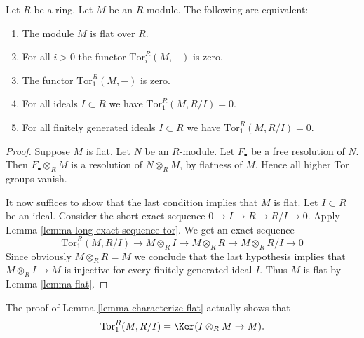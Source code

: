 \begin{lemma}
\label{lemma-characterize-flat}
Let $R$ be a ring. Let $M$ be an $R$-module.
The following are equivalent:
\begin{enumerate}
\item The module $M$ is flat over $R$.
\item For all $i > 0$ the functor $\text{Tor}_i^R(M, -)$ is zero.
\item The functor $\text{Tor}_1^R(M, -)$ is zero.
\item For all ideals $I \subset R$ we have $\text{Tor}_1^R(M, R/I) = 0$.
\item For all finitely generated ideals $I \subset R$ we have
$\text{Tor}_1^R(M, R/I) = 0$.
\end{enumerate}
\end{lemma}

\begin{proof}
Suppose $M$ is flat. Let $N$ be an $R$-module.
Let $F_\bullet$ be a free resolution of $N$.
Then $F_\bullet \otimes_R M$ is a resolution of $N \otimes_R M$,
by flatness of $M$. Hence all higher Tor groups vanish.

\medskip\noindent
It now suffices to show that the last condition implies that
$M$ is flat. Let $I \subset R$ be an ideal.
Consider the short exact sequence
$0 \to I \to R \to R/I \to 0$. Apply
Lemma \ref{lemma-long-exact-sequence-tor}. We get an
exact sequence
$$
\text{Tor}_1^R(M, R/I) \to
M \otimes_R I \to
M \otimes_R R \to
M \otimes_R R/I \to
0
$$
Since obviously $M \otimes_R R = M$ we conclude that the
last hypothesis implies that $M \otimes_R I \to M$ is
injective for every finitely generated ideal $I$.
Thus $M$ is flat by Lemma \ref{lemma-flat}.
\end{proof}

\begin{remark}
\label{remark-Tor-ring-mod-ideal}
The proof of Lemma \ref{lemma-characterize-flat} actually shows
that
$$
\text{Tor}_1^R(M, R/I)
=
\Ker(I \otimes_R M \to M).
$$
\end{remark}














